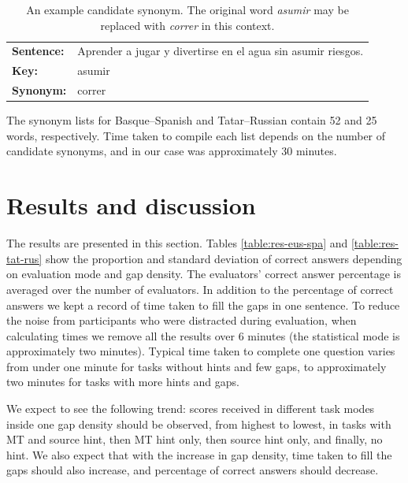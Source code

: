 \documentclass[11pt]{article}
\newcommand{\comment}[1]{\marginpar{\scriptsize\sf \textcolor{blue}{#1}}}
\begin{document}
\begin{table}
  \centering
  \begin{tabular}{|l|l|}
     \hline
     \textbf{Sentence:}   & Aprender a jugar y divertirse en el agua sin asumir riesgos. \\
     \textbf{Key:}   & asumir \\
     \textbf{Synonym:} & correr \\
     \hline
  \end{tabular}
  \caption{An example candidate synonym. The original word \emph{asumir} may be replaced with \emph{correr} in this context.} 
  \label{table:syn}
\end{table}
\comment{EA: added}
The synonym lists for Basque--Spanish and Tatar--Russian contain 52 and 25 words, respectively. Time taken to compile each list depends on the number of candidate synonyms, and in our case was approximately 30 minutes. 
\comment{FMT: How long did making the synonym list take, how many synonyms were added? More details here. Also perhaps an example?}

\section{Results and discussion}
\label{sec:results}

The results are presented in this section. Tables \ref{table:res-eus-spa} and \ref{table:res-tat-rus} show
the proportion and standard deviation of correct answers depending on evaluation mode and gap density.\comment{FMT: We should probably integrate the other tables, and refer to them using labels.} The evaluators' correct answer percentage is averaged over the number of evaluators. In addition to the percentage of correct answers we kept a record of time taken to fill the gaps in one sentence. To reduce the noise from participants who were distracted during evaluation, when
calculating times we remove all the results over 6 minutes (the statistical mode is approximately
two minutes). Typical time taken to complete one question varies from under one minute for tasks without hints and few gaps, to approximately two minutes for tasks with more hints and gaps.

We expect to see the following trend: scores received in different task modes inside one gap density should be observed, from highest to lowest, in tasks with MT and source hint, then MT hint only, then source hint only, and finally, no hint. We also expect that with the increase in gap density, time taken to fill the gaps should also increase, and percentage of correct answers should decrease. 
\end{document}
